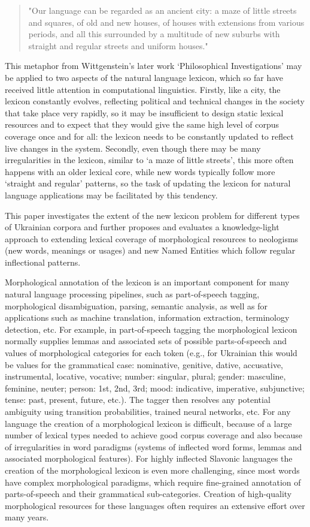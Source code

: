 \documentclass[11pt,a4paper]{article}
\begin{document}
\begin{quote}
	"Our language can be regarded as an ancient city: a maze of little streets and squares, of old and new houses, of houses with extensions from various periods, and all this surrounded by a multitude of new suburbs with straight and regular streets and uniform houses." \cite{Wittgenstein-2009}
\end{quote}
This metaphor from Wittgenstein's later work `Philosophical Investigations' may be applied to two aspects of the natural language lexicon, which so far have received little attention in computational linguistics. Firstly, like a city, the lexicon constantly evolves, reflecting political and technical changes in the society that take place very rapidly, so it may be insufficient to design static lexical resources and to expect that they would give the same high level of corpus coverage once and for all: the lexicon needs to be constantly updated to reflect live changes in the system. Secondly, even though there may be many irregularities in the lexicon, similar to `a maze of little streets', this more often happens with an older lexical core, while new words typically follow more `straight and regular' patterns, so the task of updating the lexicon for natural language applications may be facilitated by this tendency.

This paper investigates the extent of the new lexicon problem for different types of Ukrainian corpora and further proposes and evaluates a knowledge-light approach to extending lexical coverage of morphological resources to neologisms (new words, meanings or usages) and new Named Entities which follow regular inflectional patterns.

Morphological annotation of the lexicon is an important component for many natural language processing pipelines, such as part-of-speech tagging, morphological disambiguation, parsing, semantic analysis, as well as for applications such as machine translation, information extraction, terminology detection, etc. For example, in part-of-speech tagging the morphological lexicon normally supplies lemmas and associated sets of possible parts-of-speech and values of morphological categories for each token (e.g., for Ukrainian this would be values for the grammatical case: nominative, genitive, dative, accusative, instrumental, locative, vocative; number: singular, plural; gender: masculine, feminine, neuter; person: 1st, 2nd, 3rd; mood: indicative, imperative, subjunctive; tense: past, present, future, etc.). The tagger then resolves any potential ambiguity using transition probabilities, trained neural networks, etc. For any language the creation of a morphological lexicon is difficult, because of a large number of lexical types needed to achieve good corpus coverage and also because of irregularities in word paradigms (systems of inflected word forms, lemmas and associated morphological features). For highly inflected Slavonic languages the creation of the morphological lexicon is even more challenging, since most words have complex morphological paradigms, which require fine-grained annotation of parts-of-speech and their grammatical sub-categories. Creation of high-quality morphological resources for these languages often requires an extensive effort over many years.
\end{document}
